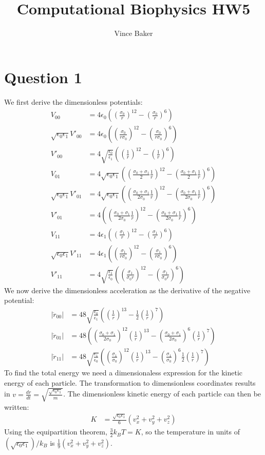 \documentclass[a4paper,11pt]{article}
\title{Computational Biophysics HW5}
\author{Vince Baker}
\numberwithin{equation}{section}
\newcommand{\ez}{\epsilon_0}
\newcommand{\eo}{\epsilon_1}
\newcommand{\lrp}[1]{\left({#1}\right)}
\begin{document}
\maketitle

\section{Question 1}
We first derive the dimensionless potentials:
\begin{align}
 V_{00} &= 4\ez\lrp{\lrp{\frac{\sigma_0}{r}}^{12}-\lrp{\frac{\sigma_0}{r}}^{6}}\\
 \sqrt{\ez\eo}V'_{00} &= 4\ez\lrp{\lrp{\frac{\sigma_0}{r\sigma_0}}^{12}-\lrp{\frac{\sigma_0}{r\sigma_0}}^{6}}\\
 V'_{00} &= 4\sqrt{\frac{\ez}{\eo}}\lrp{\lrp{\frac{1}{r}}^{12}-\lrp{\frac{1}{r}}^{6}}\\
  V_{01} &= 4\sqrt{\ez\eo} \lrp{\lrp{\frac{\sigma_0+\sigma_1}{2}\frac{1}{r}}^{12}-\lrp{\frac{\sigma_0+\sigma_1}{2}\frac{1}{r}}^{6}}\\
 \sqrt{\ez\eo}V'_{01} &= 4\sqrt{\ez\eo} \lrp{\lrp{\frac{\sigma_0+\sigma_1}{2\sigma_0}\frac{1}{r}}^{12}-\lrp{\frac{\sigma_0+\sigma_1}{2\sigma_0}\frac{1}{r}}^{6}}\\
 V'_{01} &= 4\lrp{\lrp{\frac{\sigma_0+\sigma_1}{2\sigma_0}\frac{1}{r}}^{12}-\lrp{\frac{\sigma_0+\sigma_1}{2\sigma_0}\frac{1}{r}}^{6}}\\
 V_{11} &= 4\eo\lrp{\lrp{\frac{\sigma_1}{r}}^{12}-\lrp{\frac{\sigma_1}{r}}^{6}}\\
 \sqrt{\ez\eo}V'_{11} &= 4\eo\lrp{\lrp{\frac{\sigma_1}{r\sigma_0}}^{12}-\lrp{\frac{\sigma_1}{r\sigma_0}}^{6}}\\
 V'_{11} &= 4\sqrt{\frac{\eo}{\ez}}\lrp{\lrp{\frac{\sigma_1}{\sigma_0 r}}^{12}-\lrp{\frac{\sigma_1}{\sigma_0 r}}^{6}}
\end{align}
We now derive the dimensionless acceleration as the derivative of the negative potential:
\begin{align}
 |\ddot{r}_{00}| &= 48\sqrt{\frac{\ez}{\eo}}\lrp{ \lrp{\frac{1}{r}}^{13}-\frac{1}{2}\lrp{\frac{1}{r}}^{7} }\\
 |\ddot{r}_{01}| &= 48\lrp{ \lrp{\frac{\sigma_0+\sigma_1}{2\sigma_0}}^{12}\lrp{\frac{1}{r}}^{13}-\lrp{\frac{\sigma_0+\sigma_1}{2\sigma_0}}^{6}\lrp{\frac{1}{r}}^{7} }\\
 |\ddot{r}_{11}| &= 48\sqrt{\frac{\eo}{\ez}}\lrp{ \lrp{\frac{\sigma_1}{\sigma_0}}^{12}\lrp{\frac{1}{r}}^{13}-\lrp{\frac{\sigma_1}{\sigma_0}}^{6}\frac{1}{2}\lrp{\frac{1}{r}}^{7} }
\end{align}
To find the total energy we need a dimensionaless expression for the kinetic energy of each particle. 
The transformation to dimensionless coordinates results in $v = \frac{dr}{dt} = \sqrt{\frac{\sqrt{\ez\eo}}{m}}$.
The dimensionless kinetic energy of each particle can then be written:
\begin{align}
 K &= \frac{\sqrt{\ez\eo}}{6}\lrp{v_x^2+v_y^2+v_z^2}
\end{align}
Using the equipartition theorem, $\frac{3}{2}k_B T = K$, so the temperature in units of $(\sqrt{\ez\eo})/k_B$ is $\frac{1}{9}\lrp{v_x^2+v_y^2+v_z^2} $.
\\ \\
\end{document}
